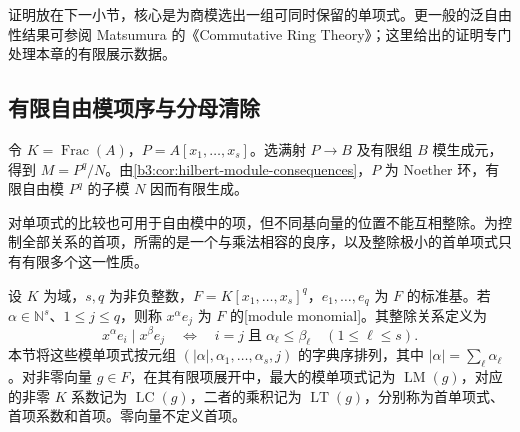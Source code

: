 \ProseParagraphBreak
证明放在下一小节，核心是为商模选出一组可同时保留的单项式。更一般的泛自由性结果可参阅 Matsumura 的《Commutative Ring Theory》\cite[\S24, Theorem 24.1, p. 186]{Matsumura1989CommutativeRingTheory}；这里给出的证明专门处理本章的有限展示数据。

\subsection{有限自由模项序与分母清除}
\label{b3:subsec:1204:02}

令 \(K=\operatorname{Frac}(A)\)，\(P=A[x_1,\ldots,x_s]\)。选满射 \(P\to B\) 及有限组 \(B\) 模生成元，得到 \(M=P^q/N\)。由\cref{b3:cor:hilbert-module-consequences}，\(P\) 为 Noether 环，有限自由模 \(P^q\) 的子模 \(N\) 因而有限生成。

对单项式的比较也可用于自由模中的项，但不同基向量的位置不能互相整除。为控制全部关系的首项，所需的是一个与乘法相容的良序，以及整除极小的首单项式只有有限多个这一性质。

\begin{definition}\label{b3:def:module-monomial-leading-data}
	设 \(K\) 为域，\(s,q\) 为非负整数，\(F=K[x_1,\ldots,x_s]^q\)，\(e_1,\ldots,e_q\) 为 \(F\) 的标准基。若 \(\alpha\in\mathbb N^s\)、\(1\le j\le q\)，则称 \(x^\alpha e_j\) 为 \(F\) 的[module monomial]。其整除关系定义为
	\[
		x^\alpha e_i\mid x^\beta e_j \quad\Longleftrightarrow\quad i=j\;\text{且}\;\alpha_\ell\le\beta_\ell\quad(1\le\ell\le s).
	\]
	本节将这些模单项式按元组 \((|\alpha|,\alpha_1,\ldots,\alpha_s,j)\) 的字典序排列，其中 \(|\alpha|=\sum_\ell\alpha_\ell\)。对非零向量 \(g\in F\)，在其有限项展开中，最大的模单项式记为 \(\operatorname{LM}(g)\)，对应的非零 \(K\) 系数记为 \(\operatorname{LC}(g)\)，二者的乘积记为 \(\operatorname{LT}(g)\)，分别称为首单项式、首项系数和首项。零向量不定义首项。
\end{definition}

